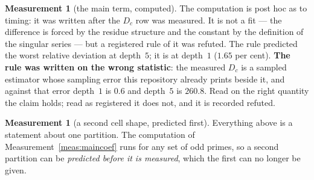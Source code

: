 \documentclass[11pt,a4paper]{article}
\theoremstyle{plain}
\theoremstyle{definition}
\newtheorem{measurement}[theorem]{Measurement}
\theoremstyle{remark}
\begin{document}
\begin{measurement}[the main term, computed]
The computation is post hoc as to timing: it was written after the
$D_c$ row was measured. It is not a fit --- the difference is forced by
the residue structure and the constant by the definition of the
singular series --- but a registered rule of it was refuted. The rule
predicted the worst relative deviation at depth~$5$; it is at depth~$1$
($1.65$ per cent). \textbf{The rule was written on the wrong
statistic}: the measured $D_c$ is a sampled estimator whose sampling
error this repository already prints beside it, and against that error
depth~$1$ is $0.6$ and depth~$5$ is $260.8$. Read on the right
quantity the claim holds; read as registered it does not, and it is
recorded refuted.
\end{measurement}

\begin{measurement}[a second cell shape, predicted first]\label{meas:secondcell}
Everything above is a statement about one partition. The computation
of Measurement~\ref{meas:maincoef} runs for any set of odd primes, so a
second partition can be \emph{predicted before it is measured}, which
the first can no longer be given.


\end{measurement}
\end{document}
